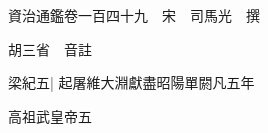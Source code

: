 






























































資治通鑑卷一百四十九　宋　司馬光　撰

胡三省　音註

梁紀五|{
	起屠維大淵獻盡昭陽單閼凡五年}


高祖武皇帝五

